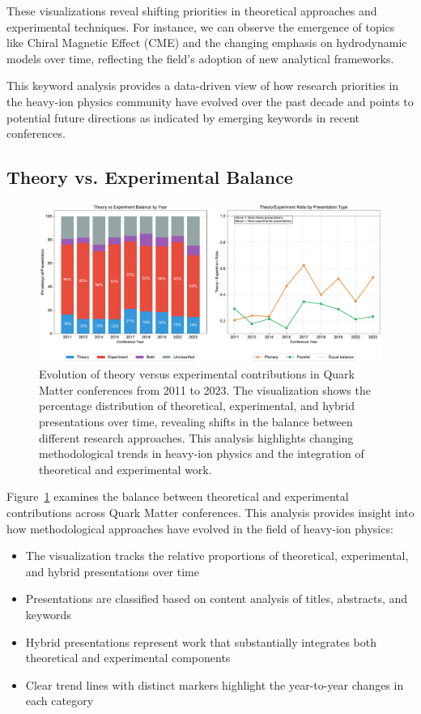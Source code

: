 \documentclass[a4paper,11pt]{article}
\begin{document}
These visualizations reveal shifting priorities in theoretical approaches and experimental techniques. For instance, we can observe the emergence of topics like Chiral Magnetic Effect (CME) and the changing emphasis on hydrodynamic models over time, reflecting the field's adoption of new analytical frameworks.

This keyword analysis provides a data-driven view of how research priorities in the heavy-ion physics community have evolved over the past decade and points to potential future directions as indicated by emerging keywords in recent conferences.

\subsection{Theory vs. Experimental Balance}

\begin{figure}[H]
\centering
\includegraphics[width=\textwidth]{figures/theory_experiment_balance.pdf}
\caption{Evolution of theory versus experimental contributions in Quark Matter conferences from 2011 to 2023. The visualization shows the percentage distribution of theoretical, experimental, and hybrid presentations over time, revealing shifts in the balance between different research approaches. This analysis highlights changing methodological trends in heavy-ion physics and the integration of theoretical and experimental work.}
\label{fig:theory_experiment}
\end{figure}

Figure~\ref{fig:theory_experiment} examines the balance between theoretical and experimental contributions across Quark Matter conferences. This analysis provides insight into how methodological approaches have evolved in the field of heavy-ion physics:

\begin{itemize}
    \item The visualization tracks the relative proportions of theoretical, experimental, and hybrid presentations over time
    \item Presentations are classified based on content analysis of titles, abstracts, and keywords
    \item Hybrid presentations represent work that substantially integrates both theoretical and experimental components
    \item Clear trend lines with distinct markers highlight the year-to-year changes in each category
\end{itemize}
\end{document}
